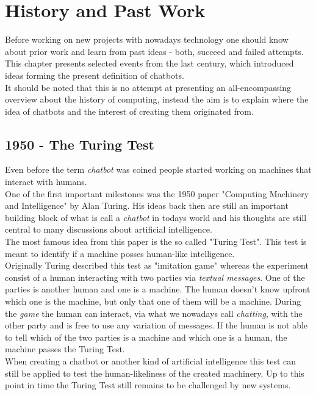 \section{History and Past Work}


Before working on new projects with nowadays technology one should know about prior work and learn from past ideas - both, succeed and failed attempts.
\\
This chapter presents selected events from the last century, which introduced ideas forming the present definition of chatbots.
\\
It should be noted that this is no attempt at presenting an all-encompassing overview about the history of computing, instead the aim is to explain where the idea of chatbots and the interest of creating them originated from.


\subsection{1950 - The Turing Test}

Even before the term \emph{chatbot} was coined people started working on machines that interact with humans.
\\
One of the first important milestones was the 1950 paper "Computing Machinery and Intelligence" by Alan Turing\cite{turing}. His ideas back then are still an important building block of what is call a \emph{chatbot} in todays world and his thoughts are still central to many discussions about artificial intelligence.
\\
The most famous idea from this paper is the so called "Turing Test". This test is meant to identify if a machine posses human-like intelligence.
\\
Originally Turing described this test as "imitation game" whereas the experiment consist of a human interacting with two parties via \emph{textual messages}. One of the parties is another human and one is a machine. The human doesn't know upfront which one is the machine, but only that one of them will be a machine. During the \emph{game} the human can interact, via what we nowadays call \emph{chatting}, with the other party and is free to use any variation of messages. If the human is not able to tell which of the two parties is a machine and which one is a human, the machine passes the Turing Test.
\\
When creating a chatbot or another kind of artificial intelligence this test can still be applied to test the human-likeliness of the created machinery. Up to this point in time the Turing Test still remains to be challenged by new systems.


